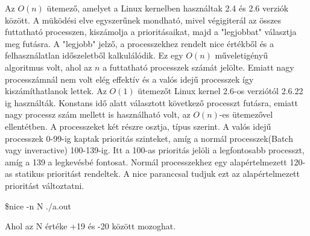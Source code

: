 


Az $O(n)$ ütemező, amelyet a Linux kernelben használtak 2.4 és 2.6 verziók között. A müködési elve egyszerűnek mondható, mivel végigiterál az összes futtatható processzen, kiszámolja a prioritásaikat, majd a "legjobbat" választja meg futásra. A "legjobb" jelző, a processzekhez rendelt nice értékből és a felhasználatlan időszeletből kalkulálódik.
Ez egy $O(n)$ műveletigényű algoritmus volt, ahol az $n$ a futtatható processzek számát jelölte. Emiatt nagy processzámnál nem volt elég effektív és a valós idejű processzek így kiszámíthatlanok lettek.
Az $O(1)$ ütemezőt Linux kernel 2.6-os verziótól 2.6.22 ig használták. Konstans idő alatt választott következő processzt futásra, emiatt nagy processz szám mellett is használható volt, az $O(n)$-es ütemezővel ellentétben.
A processzeket két részre osztja, típus szerint. A valós idejű processzek 0-99-ig kaptak prioritás szinteket, amíg a normál processzek(Batch vagy inveractive) 100-139-ig. Itt a 100-as prioritás jelöli a legfontosabb processzt, amíg a 139 a legkevésbé fontosat. Normál processzekhez egy alapértelmezett 120-as statikus prioritást rendeltek. A nice paranccsal tudjuk ezt az alapértelmezett prioritást változtatni.
\begin{cpp}
\$nice -n N ./a.out 
\end{cpp}
Ahol az N értéke +19 és -20 között mozoghat.

